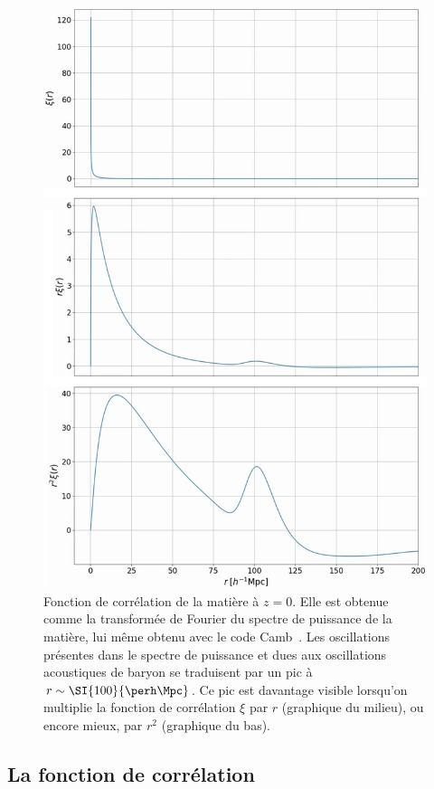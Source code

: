 \begin{figure}
  \centering
  \includegraphics[scale=0.45, angle=270]{xi_camb}
  \caption{Fonction de corrélation de la matière à $z = 0$. Elle est obtenue comme la transformée de Fourier du spectre de puissance de la matière, lui même obtenu avec le code Camb~\autocite{Lewis1999}. Les oscillations présentes dans le spectre de puissance et dues aux oscillations acoustiques de baryon se traduisent par un pic à $r \sim \SI{100}{\perh\Mpc}$. Ce pic est davantage visible lorsqu'on multiplie la fonction de corrélation $\xi$ par $r$ (graphique du milieu), ou encore mieux, par $r^2$ (graphique du bas).}
  \label{fig:xi_camb}
\end{figure}

\subsection{La fonction de corrélation}

